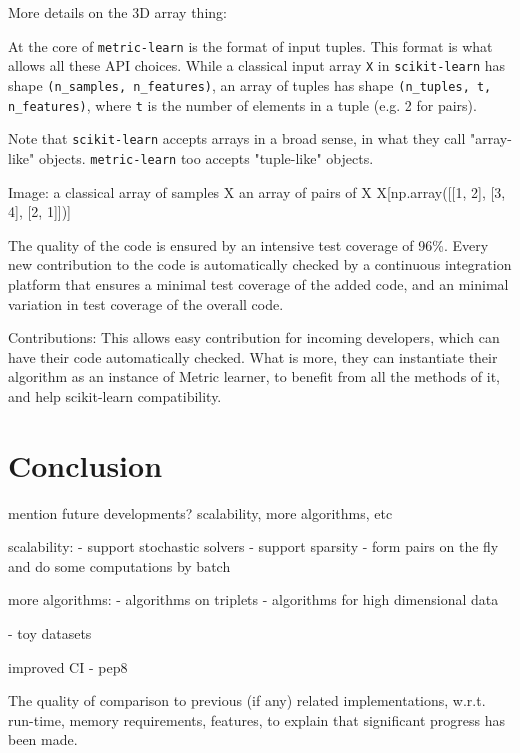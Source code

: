 \documentclass[twoside,11pt]{article}
\begin{document}
More details on the 3D array thing: 

At the core of \texttt{metric-learn} is the format of input tuples. This format is what allows all these API choices. While a classical input array \texttt{X} in \texttt{scikit-learn} has shape \texttt{(n\_samples, n\_features)}, an array of tuples has shape \texttt{(n\_tuples, t, n\_features)}, where \texttt{t} is the number of elements in a tuple (e.g. 2 for pairs).

Note that \texttt{scikit-learn} accepts arrays in a broad sense, in what they call "array-like" objects. \texttt{metric-learn} too accepts "tuple-like" objects.


Image: a classical array of samples X
an array of pairs of X X[np.array([[1, 2], [3, 4], [2, 1]])]



The quality of the code is ensured by an intensive test coverage of 96\%. Every new contribution to the code is automatically checked by a continuous integration platform that ensures a minimal test coverage of the added code, and an minimal variation in test coverage of the overall code. 

Contributions: This allows easy contribution for incoming developers, which can have their code automatically checked. What is more, they can instantiate their algorithm as an instance of Metric learner, to benefit from all the methods of it, and help scikit-learn compatibility. 

\section{Conclusion}

mention future developments? scalability, more algorithms, etc

scalability: 
- support stochastic solvers
- support sparsity
- form pairs on the fly and do some computations by batch

more algorithms:
- algorithms on triplets
- algorithms for high dimensional data

- toy datasets

improved CI
- pep8


 The quality of comparison to previous (if any) related implementations, w.r.t. run-time, memory requirements, features, to explain that significant progress has been made. 



\end{document}
